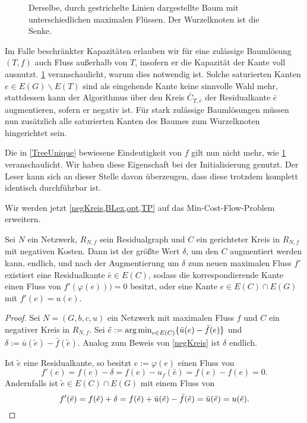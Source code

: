 \begin{figure}[!ht]\centering
		
	\caption{Derselbe, durch gestrichelte Linien dargestellte Baum mit unterschiedlichen maximalen Flüssen. Der Wurzelknoten ist die Senke.}
	\label{fig:NSA}
\end{figure}

Im Falle beschränkter Kapazitäten erlauben wir für eine zulässige Baumlösung $(T,f)$ auch Fluss außerhalb von $T$, insofern er die Kapazität der Kante voll ausnutzt. \cref{fig:NSA} veranschaulicht, warum dies notwendig ist. Solche saturierten Kanten $e\in E(G)\backslash E(T)$ sind als eingehende Kante keine sinnvolle Wahl mehr, stattdessen kann der Algorithmus über den Kreis $\bar{C}_{T,\bar{e}}$ der Residualkante $\bar{e}$ augmentieren, sofern er negativ ist. Für stark zulässige Baumlösungen müssen nun zusätzlich alle saturierten Kanten des Baumes zum Wurzelknoten hingerichtet sein.

Die in \cref{TreeUnique} bewiesene Eindeutigkeit von $f$ gilt nun nicht mehr, wie \cref{fig:NSA} veranschaulicht. Wir haben diese Eigenschaft bei der Initialisierung genutzt. Der Leser kann sich an dieser Stelle davon überzeugen, dass diese trotzdem komplett identisch durchführbar ist.

Wir werden jetzt \cref{negKreis,BLex,opt,TP} auf das Min-Cost-Flow-Problem erweitern.

\begin{lem}\label{negKreis2}Sei $N$ ein Netzwerk, $R_{N,f}$ sein Residualgraph und $C$ ein gerichteter Kreis in $R_{N,f}$ mit negativen Kosten. Dann ist der größte Wert $\delta$, um den $C$ augmentiert werden kann, endlich, und nach der Augmentierung um $\delta$ zum neuen maximalen Fluss $f'$ existiert eine Residualkante $\bar{e}\in E(C)$, sodass die korrespondierende Kante einen Fluss von $f'(\varphi(e)))=0$ besitzt, oder eine Kante $e\in E(C)\cap E(G)$ mit $f'(e)=u(e)$.\end{lem}
\begin{proof}Sei $N=(G,b,c,u)$ ein Netzwerk mit maximalen Fluss $f$ und $C$ ein negativer Kreis in $R_{N,f}$. Sei $\tilde{e}:=\operatorname*{arg\,min}_{e\in E(C)}\{\bar{u}(e)-\bar{f}(e)\}$ und $\delta:=\bar{u}(\tilde{e})-\bar{f}(\tilde{e})$. Analog zum Beweis von \cref{negKreis} ist $\delta$ endlich.
	
Ist $\tilde{e}$ eine Residualkante, so besitzt $e:=\varphi(e)$ einen Fluss von
\begin{equation*}
f'(e)=f(e)-\delta=f(e)-u_f(\bar{e})=f(e)-f(e)=0.\end{equation*} Andernfalls ist $\tilde{e}\in E(C)\cap E(G)$ mit einem Fluss von
\begin{equation*}
f'(\tilde{e})=f(\tilde{e})+\delta=f(\tilde{e})+\bar{u}(\tilde{e})-\bar{f}(\tilde{e})=\bar{u}(\tilde{e})=u(\tilde{e}).\qedhere\end{equation*}\end{proof}

